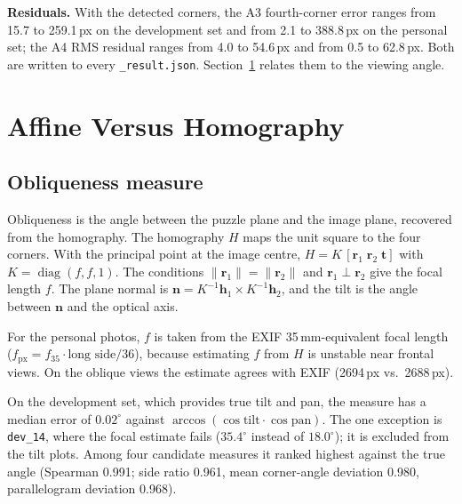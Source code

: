 \documentclass[conference]{IEEEtran}
\begin{document}
\textbf{Residuals.} With the detected corners, the A3 fourth-corner error ranges from 15.7 to 259.1\,px on the development set and from 2.1 to 388.8\,px on the personal set; the A4 RMS residual ranges from 4.0 to 54.6\,px and from 0.5 to 62.8\,px. Both are written to every \texttt{\_result.json}. Section~\ref{sec:compare} relates them to the viewing angle.

\section{Affine Versus Homography}
\label{sec:compare}
\subsection{Obliqueness measure}
Obliqueness is the angle between the puzzle plane and the image plane, recovered from the homography. The homography $H$ maps the unit square to the four corners. With the principal point at the image centre, $H = K\,[\mathbf{r}_1\;\mathbf{r}_2\;\mathbf{t}]$ with $K=\operatorname{diag}(f,f,1)$. The conditions $\lVert\mathbf{r}_1\rVert=\lVert\mathbf{r}_2\rVert$ and $\mathbf{r}_1\perp\mathbf{r}_2$ give the focal length $f$. The plane normal is $\mathbf{n}=K^{-1}\mathbf{h}_1\times K^{-1}\mathbf{h}_2$, and the tilt is the angle between $\mathbf{n}$ and the optical axis.

For the personal photos, $f$ is taken from the EXIF 35\,mm-equivalent focal length ($f_\text{px}=f_{35}\cdot\text{long side}/36$), because estimating $f$ from $H$ is unstable near frontal views. On the oblique views the estimate agrees with EXIF (2694\,px vs.\ 2688\,px).

On the development set, which provides true tilt and pan, the measure has a median error of $0.02^\circ$ against $\arccos(\cos\text{tilt}\cdot\cos\text{pan})$. The one exception is \texttt{dev\_14}, where the focal estimate fails ($35.4^\circ$ instead of $18.0^\circ$); it is excluded from the tilt plots. Among four candidate measures it ranked highest against the true angle (Spearman 0.991; side ratio 0.961, mean corner-angle deviation 0.980, parallelogram deviation 0.968).
\end{document}
